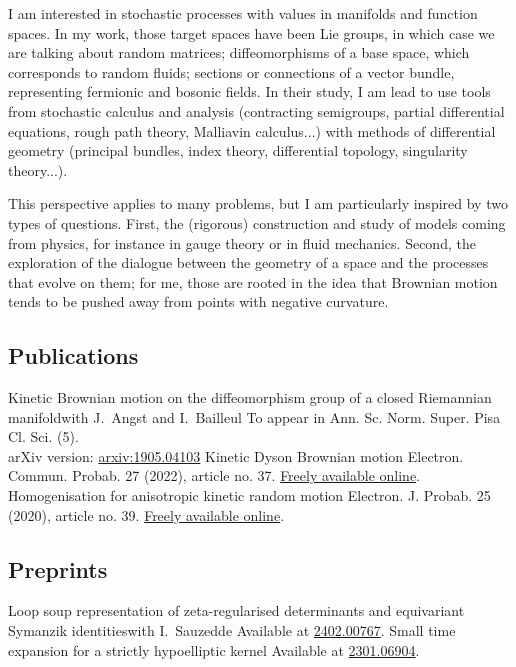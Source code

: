 \documentclass[11pt,classic,colorlinks]{moderncv}
\begin{document}
\medskip

I am interested in stochastic processes with values in manifolds and function spaces. In my work, those target spaces have been Lie groups, in which case we are talking about random matrices; diffeomorphisms of a base space, which corresponds to random fluids; sections or connections of a vector bundle, representing fermionic and bosonic fields. In their study, I am lead to use tools from stochastic calculus and analysis (contracting semigroups, partial differential equations, rough path theory, Malliavin calculus...) with methods of differential geometry (principal bundles, index theory, differential topology, singularity theory...).
\smallskip

This perspective applies to many problems, but I am particularly inspired by two types of questions. First, the (rigorous) construction and study of models coming from physics, for instance in gauge theory or in fluid mechanics. Second, the exploration of the dialogue between the geometry of a space and the processes that evolve on them; for me, those are rooted in the idea that Brownian motion tends to be pushed away from points with negative curvature.
\newpage

\subsection{Publications}
   {Kinetic Brownian motion on the diffeomorphism group of a closed Riemannian manifold}{with J.~Angst and I.~Bailleul}{}{}
   {To appear in Ann. Sc. Norm. Super. Pisa Cl. Sci. (5).\\
    arXiv version: \href{https://arxiv.org/abs/1905.04103}{arxiv:1905.04103}}
   {Kinetic Dyson Brownian motion}{}{}{}
   {Electron. Commun. Probab. 27 (2022), article no. 37. \href{ https://doi.org/10.1214/22-ECP480}{Freely available online}.}
   {Homogenisation for anisotropic kinetic random motion}{}{}{}
   {Electron. J. Probab. 25 (2020), article no. 39. \href{ https://doi.org/10.1214/20-EJP439}{Freely available online}.}
\subsection{Preprints}
   {Loop soup representation of zeta-regularised determinants and equivariant Symanzik identities}{with I.~Sauzedde}{}{}
   {Available at \href{https://arxiv.org/abs/2402.00767}{2402.00767}.}
   {Small time expansion for a strictly hypoelliptic kernel}{}{}{}
   {Available at \href{https://arxiv.org/abs/2301.06904}{2301.06904}.}
\end{document}

